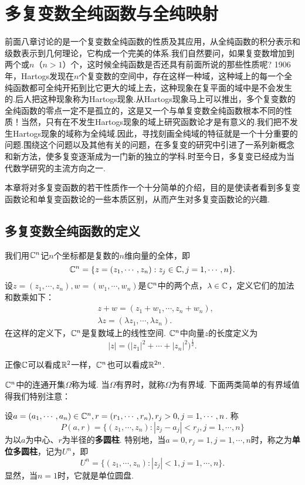 \chapter{多复变数全纯函数与全纯映射\label{chap9}}
前面八章讨论的是一个复变数全纯函数的性质及其应用，从全纯函数的积分表示和级数表示到几何理论，它构成一个完美的体系.我们自然要问，如果复变数增加到两个或$n$（$n>1$）个，这时候全纯函数是否还具有前面所说的那些性质呢? 1906年，Hartogs发现在$n$个复变数的空间中，存在这样一种域，这种域上的每一个全纯函数都可全纯开拓到比它更大的域上去，这种现象在复平面的域中是不会发生的.后人把这种现象称为Hartogs现象.从Hartogs现象马上可以推出，多个复变数的全纯函数的零点一定不是孤立的，这是又一个与单复变数全纯函数根本不同的性质！当然，只有在不发生Hartogs现象的域上研究函数论才是有意义的.我们把不发生Hartogs现象的域称为全纯域.因此，寻找刻画全纯域的特征就是一个十分重要的问题.围绕这个问题以及其他有关的问题，在多复变的研究中引进了一系列新概念和新方法，使多复变逐渐成为一门新的独立的学科.时至今日，多复变已经成为当代数学研究的主流方向之一.

本章将对多复变函数的若干性质作一个十分简单的介绍，目的是使读者看到多复变函数论和单复变函数论的一些本质区别，从而产生对多复变函数论的兴趣.

\section{多复变数全纯函数的定义\label{sec9.1}}
我们用$\mathbb C^n$记$n$个坐标都是复数的$n$维向量的全体，即
\[\mathbb C^n=\{z=(z_1,\cdots,z_n):z_j\in\mathbb C,j=1,\cdots,n\}.\]
设$z=(z_1,\cdots,z_n),w=(w_1,\cdots,w_n)$是$\mathbb C^n$中的两个点，$\lambda\in\mathbb C$，定义它们的加法和数乘如下：
\begin{align*}
&z+w=(z_1+w_1,\cdots,z_n+w_n),\\
&\lambda z=(\lambda z_1,\cdots,\lambda z_n).
\end{align*}
在这样的定义下，$\mathbb C^n$是复数域上的线性空间. $\mathbb C^n$中向量$z$的长度定义为
\[|z|=\big(|z_1|^2+\cdots+|z_n|^2\big)^{\frac12}.\]

正像$\mathbb C$可以看成$\mathbb R^2$一样，$\mathbb C^n$也可以看成$\mathbb R^{2n}$.

$\mathbb C^n$中的连通开集$\Omega$称为域. 当$\Omega$有界时，就称$\Omega$为有界域.
下面两类简单的有界域值得我们特别注意：

设$a=(a_1,\cdots,a_n)\in\mathbb C^n,r=(r_1,\cdots,r_n),r_j>0,j=1,\cdots,n$. 称
\[P(a,r)=\{(z_1,\cdots,z_n):|z_j-a_j|<r_j,j=1,\cdots,n\}\]
为以$a$为中心、$r$为半径的\textbf{多圆柱}. 特别地，当$a=0,r_j=1,j=1,\cdots,n$时，称之为\textbf{单位多圆柱}，记为$U^n$，即
\[U^n=\{(z_1,\cdots,z_n):|z_j|<1,j=1,\cdots,n\}.\]
显然，当$n=1$时，它就是单位圆盘.

